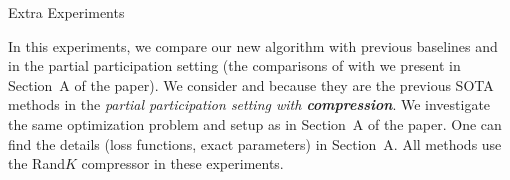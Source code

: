 \documentclass[10pt]{article}
\begin{document}
\vspace{-8cm}
\begin{center}
    Extra Experiments
\end{center}
In this experiments, we compare our new algorithm  with previous baselines  and  in the partial participation setting (the comparisons of  with  we present in Section~A of the paper). We consider  and  because they are the previous SOTA methods in the \emph{partial participation setting with {\bf compression}}. We investigate the same optimization problem and setup as in Section~A of the paper. One can find the details (loss functions, exact parameters) in Section~A. All methods use the Rand$K$ compressor in these experiments.
\end{document}
